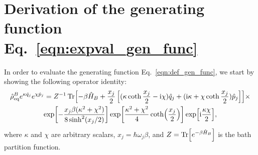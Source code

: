 \documentclass[preprint,aip,jcp]{revtex4-2}
\newcommand{\im}{\textup{i}}
\begin{document}
\section{Derivation of the generating function Eq.~\ref{eqn:expval_gen_func} \label{app:deriv_gen_func}}
In order to evaluate the generating function Eq.~\ref{eqn:def_gen_func}, we start by showing the following operator identity: 
\begin{multline}\label{eqn:key_exponential_property}
    \hat{\rho}_\text{eq}^{B} e^{\kappa \hat{q}_j} e^{\chi \hat{p}_j} = Z^{-1} \Tr[-\beta\hat{H}_B + \frac{x_j}{2} \left[(\kappa\coth\frac{x_j}{2} - \im \chi) \hat{q}_j + (\im \kappa + \chi \coth\frac{x_j}{2}) \hat{p}_j \right] ] \times \\
    \exp[-\frac{x_j \beta (\kappa^2 + \chi^2)}{8 \sinh^2(x_j/2)}] \exp[\frac{\kappa^2+\chi^2}{4} \coth(\frac{x_j}{2})] \exp[\im \frac{\kappa\chi}{2}],
\end{multline}
where $\kappa$ and $\chi$ are arbitrary scalars, $x_j = \hbar\omega_j\beta$, and $Z=\Tr[e^{-\beta \hat{H}_B}]$ is the bath partition function. 
\end{document}

